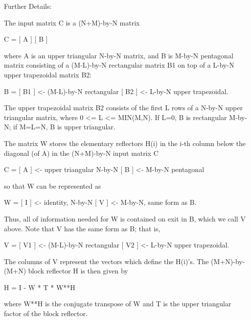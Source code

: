 \begin{DoxyParagraph}{Further Details\+: }
\begin{DoxyVerb}  The input matrix C is a (N+M)-by-N matrix  

               C = [ A ]
                   [ B ]        

  where A is an upper triangular N-by-N matrix, and B is M-by-N pentagonal
  matrix consisting of a (M-L)-by-N rectangular matrix B1 on top of a L-by-N
  upper trapezoidal matrix B2:

               B = [ B1 ]  <- (M-L)-by-N rectangular
                   [ B2 ]  <-     L-by-N upper trapezoidal.

  The upper trapezoidal matrix B2 consists of the first L rows of a
  N-by-N upper triangular matrix, where 0 <= L <= MIN(M,N).  If L=0, 
  B is rectangular M-by-N; if M=L=N, B is upper triangular.  

  The matrix W stores the elementary reflectors H(i) in the i-th column
  below the diagonal (of A) in the (N+M)-by-N input matrix C

               C = [ A ]  <- upper triangular N-by-N
                   [ B ]  <- M-by-N pentagonal

  so that W can be represented as

               W = [ I ]  <- identity, N-by-N
                   [ V ]  <- M-by-N, same form as B.

  Thus, all of information needed for W is contained on exit in B, which
  we call V above.  Note that V has the same form as B; that is, 

               V = [ V1 ] <- (M-L)-by-N rectangular
                   [ V2 ] <-     L-by-N upper trapezoidal.

  The columns of V represent the vectors which define the H(i)'s.  
  The (M+N)-by-(M+N) block reflector H is then given by

               H = I - W * T * W**H

  where W**H is the conjugate transpose of W and T is the upper triangular
  factor of the block reflector.\end{DoxyVerb}
 
\end{DoxyParagraph}
